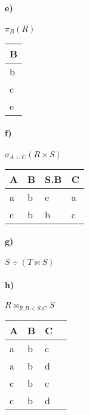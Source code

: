 \begin{multicols}{4}
	\paragraph{e)} $\pi_B(R)$
	
	\hspace*{0.063cm}
	\begin{tabular}{| l | }
		\hline
		\rowcolor{TableHeader} \textbf{B} \\
		\hline
		 b\\
		\hline
		 c\\
		\hline
		 e\\
		\hline
	\end{tabular}
	
	\vfill\null
	
	\columnbreak
	\paragraph{f)} $\sigma_{A=C}(R\times S)$
	
\hspace*{0.063cm}
\begin{tabular}{| l | l | l | l |}
	\hline
	\rowcolor{TableHeader}\textbf{A} &  \textbf{B} & \textbf{S.B} &  \textbf{C}\\
	\hline
	a & b & e & a\\
	\hline
	c & b& b & c\\
	\hline
\end{tabular}	
	\vfill\null
	
	\columnbreak
	\paragraph{g)} $S \div (T \bowtie S)$
	
	\hspace*{0.063cm}
	\vfill\null
	\columnbreak
	\paragraph{h)} $R\bowtie_{R.B < S.C} S$

\hspace*{0.063cm}
\begin{tabular}{| l | l | l | l |}
	\hline
	\rowcolor{TableHeader}\textbf{A} &  \textbf{B} &   \textbf{C}\\
	\hline
	a & b & c \\
	\hline
	a & b & d \\
	\hline
	c & b & c \\
	\hline
	c & b & d\\
	\hline
\end{tabular}
\end{multicols}
